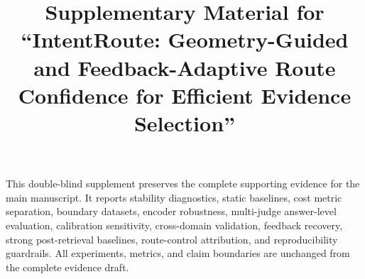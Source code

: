 \documentclass[a4paper,fleqn,doubleblind]{cas-sc}
\begin{document}

\title[mode=title]{Supplementary Material for ``IntentRoute: Geometry-Guided and Feedback-Adaptive Route Confidence for Efficient Evidence Selection''}

\maketitle

This double-blind supplement preserves the complete supporting evidence for
the main manuscript. It reports stability diagnostics, static baselines, cost
metric separation, boundary datasets, encoder robustness, multi-judge
answer-level evaluation, calibration sensitivity, cross-domain validation,
feedback recovery, strong post-retrieval baselines, route-control attribution,
and reproducibility guardrails. All experiments, metrics, and claim boundaries
are unchanged from the complete evidence draft.

\clearpage

\setcounter{section}{0}
\renewcommand{\thesection}{S\arabic{section}}
\renewcommand{\thesubsection}{\thesection.\arabic{subsection}}
\setcounter{table}{0}
\renewcommand{\thetable}{S\arabic{table}}


\end{document}
